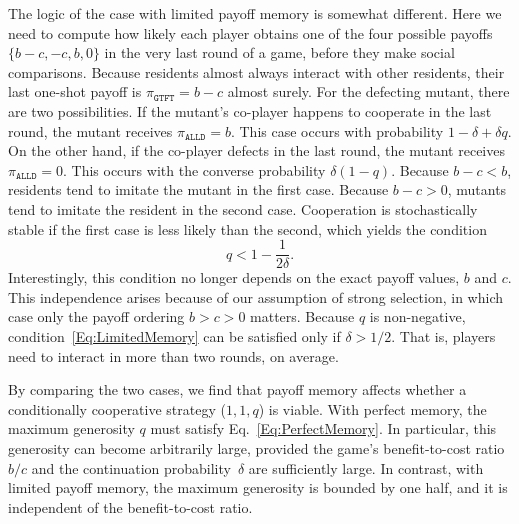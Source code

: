\documentclass[11pt]{article}
\def\alld{\texttt{ALLD}}
\def\gtft{\texttt{GTFT}}
\theoremstyle{plainCl1}
\theoremstyle{plainCl2}
\begin{document}

The logic of the case with limited payoff memory is somewhat different. 
Here we need to compute how likely each player obtains one of the four possible payoffs $\{b\!-\!c, -c, b, 0\}$ in the very last round of a game, before they make social comparisons.
Because residents almost always interact with other residents, their last one-shot payoff is $\pi_\gtft = b\!-\!c$ almost surely. 
For the defecting mutant, there are two possibilities. If the mutant's co-player happens to cooperate in the last round, the mutant receives $\pi_\alld\!=\!b$. This case occurs with probability $1\!-\!\delta\!+\!\delta q$. On the other hand, if the co-player defects in the last round, the mutant receives $\pi_\alld=\!0$. This occurs with the converse probability $\delta(1\!-\!q)$.
Because $b\!-\!c\!<\!b$, residents tend to imitate the mutant in the first case. 
Because $b\!-\!c\!>\!0$, mutants tend to imitate the resident in the second case. 
Cooperation is stochastically stable if the first case is less likely than the second, which yields the condition
\begin{equation} \label{Eq:LimitedMemory}
q < 1\!-\!\frac{1}{2 \delta}.
\end{equation}
Interestingly, this condition no longer depends on the exact payoff values, $b$ and $c$. 
This independence arises because of our assumption of strong selection, in which case only the payoff ordering $b\!>\!c\!>\!0$ matters. Because $q$ is non-negative, condition~\eqref{Eq:LimitedMemory} can be satisfied only if $\delta\!>\!1/2$. That is, players need to interact in more than two rounds, on average. 


By comparing the two cases, we find that payoff memory affects whether a conditionally cooperative strategy ($1,1,q$) is viable. 
With perfect memory, the maximum generosity $q$ must satisfy Eq.~\eqref{Eq:PerfectMemory}.
In particular, this generosity can become arbitrarily large, provided the game's benefit-to-cost ratio~$b/c$ and the continuation probability~$\delta$ are sufficiently large. 
In contrast, with limited payoff memory, the maximum generosity is bounded by one half, and it is independent of the benefit-to-cost ratio.\\


\end{document}
